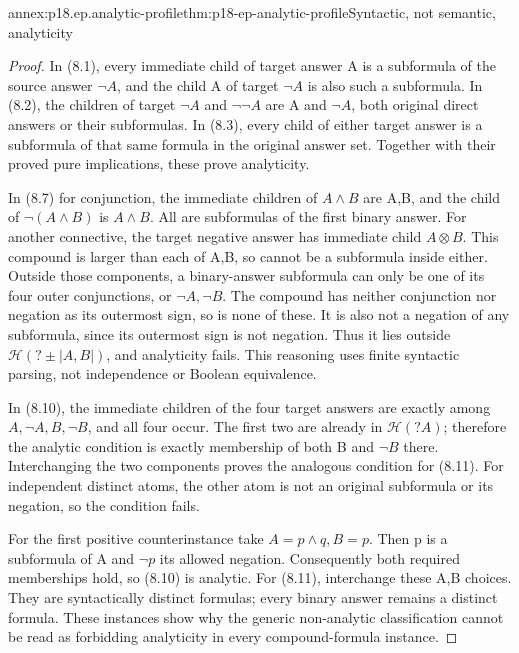 \begin{annexitem}{annex:p18.ep.analytic-profile}{thm:p18-ep-analytic-profile}{Syntactic, not semantic, analyticity}
\begin{proof}
In (8.1), every immediate child of target answer A is a subformula of
the source answer \(\neg A\), and the child A of target \(\neg A\)
is also such a subformula. In (8.2), the children of target \(\neg A\)
and \(\neg\neg A\) are A and \(\neg A\), both original direct
answers or their subformulas. In (8.3), every child of either target
answer is a subformula of that same formula in the original answer set.
Together with their proved pure implications, these prove analyticity.

In (8.7) for conjunction, the immediate children of \(A\land B\)
are A,B, and the child of \(\neg(A\land B)\) is \(A\land B\).
All are subformulas of the first binary answer. For another connective,
the target negative answer has immediate child \(A\otimes B\).
This compound is larger than each of A,B, so cannot be a subformula
inside either. Outside those components, a binary-answer subformula can
only be one of its four outer conjunctions, or \(\neg A,\neg B\).
The compound has neither conjunction nor negation as its outermost sign,
so is none of these. It is also not a negation of any subformula, since
its outermost sign is not negation. Thus it lies outside
\(\mathcal H(?\pm|A,B|)\), and analyticity fails. This reasoning
uses finite syntactic parsing, not independence or Boolean equivalence.

In (8.10), the immediate children of the four target answers are exactly
among \(A,\neg A,B,\neg B\), and all four occur. The first two
are already in \(\mathcal H(?A)\); therefore the analytic condition
is exactly membership of both B and \(\neg B\) there. Interchanging
the two components proves the analogous condition for (8.11).
For independent distinct atoms, the other atom is not an original
subformula or its negation, so the condition fails.

For the first positive counterinstance take \(A=p\land q,B=p\).
Then p is a subformula of A and \(\neg p\) its allowed negation.
Consequently both required memberships hold, so (8.10) is analytic.
For (8.11), interchange these A,B choices. They are syntactically
distinct formulas; every binary answer remains a distinct formula.
These instances show why the generic non-analytic classification cannot
be read as forbidding analyticity in every compound-formula instance.
\end{proof}
\end{annexitem}

